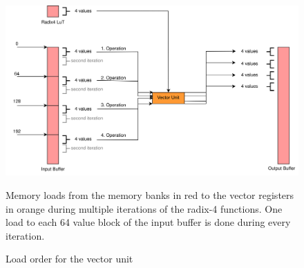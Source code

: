 \begin{figure}[h]
    \centering
    \includegraphics[width=1.0\textwidth]{images/vector_load.png}
    \captionsetup{justification=centering}
    \caption{Load order for the vector unit}
        Memory loads from the memory banks in red to the vector registers in orange during multiple iterations of the radix-4 functions. One load to each 64 value block of the input buffer is done during every iteration. 
    \label{fig:vector_load}
\end{figure}

